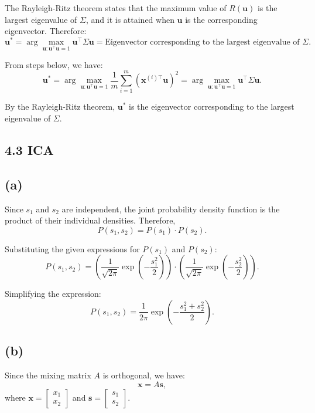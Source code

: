 \documentclass[12pt]{article}
\begin{document}
The Rayleigh-Ritz theorem states that the maximum value of \( R(\mathbf{u}) \) is the largest eigenvalue of \( \Sigma \), and it is attained when \( \mathbf{u} \) is the corresponding eigenvector.
Therefore:
\[
\mathbf{u}^* = \arg \max_{\mathbf{u}: \mathbf{u}^\top \mathbf{u} = 1} \mathbf{u}^\top \Sigma \mathbf{u} = \text{Eigenvector corresponding to the largest eigenvalue of } \Sigma.
\]

From steps below, we have:
\[
\mathbf{u}^* = \arg \max_{\mathbf{u}: \mathbf{u}^\top \mathbf{u} = 1} \frac{1}{m} \sum_{i=1}^m (\mathbf{x}^{(i)\top} \mathbf{u})^2 = \arg \max_{\mathbf{u}: \mathbf{u}^\top \mathbf{u} = 1} \mathbf{u}^\top \Sigma \mathbf{u}.
\]

By the Rayleigh-Ritz theorem, \( \mathbf{u}^* \) is the eigenvector corresponding to the largest eigenvalue of \( \Sigma \).

\subsection*{4.3 ICA}

\subsection*{(a)}

Since \( s_1 \) and \( s_2 \) are independent, the joint probability density function is the product of their individual densities. Therefore,
\[
P(s_1, s_2) = P(s_1) \cdot P(s_2).
\]

Substituting the given expressions for \( P(s_1) \) and \( P(s_2) \):
\[
P(s_1, s_2) = \left( \frac{1}{\sqrt{2\pi}} \exp\left( -\frac{s_1^2}{2} \right) \right) \cdot \left( \frac{1}{\sqrt{2\pi}} \exp\left( -\frac{s_2^2}{2} \right) \right).
\]

Simplifying the expression:
\[
P(s_1, s_2) = \frac{1}{2\pi} \exp\left( -\frac{s_1^2 + s_2^2}{2} \right).
\]

\subsection*{(b)}

Since the mixing matrix \( A \) is orthogonal, we have:
\[
\mathbf{x} = A \mathbf{s},
\]
where \( \mathbf{x} = \begin{bmatrix} x_1 \\ x_2 \end{bmatrix} \) and \( \mathbf{s} = \begin{bmatrix} s_1 \\ s_2 \end{bmatrix} \).
\end{document}
